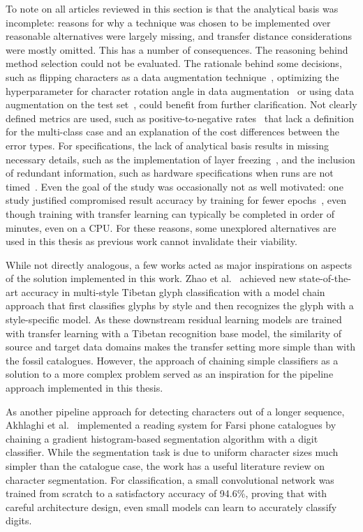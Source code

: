 \documentclass[english,twoside,openright]{UH_DS_MSc}
\begin{document}
To note on all articles reviewed in this section is that the analytical basis was incomplete: reasons for why a technique 
was chosen to be implemented over reasonable alternatives were largely missing, and transfer distance considerations were 
mostly omitted. This has a number of consequences. The reasoning behind method selection could not be evaluated. The rationale 
behind some decisions, such as flipping characters as a data augmentation technique~\cite{9thuonPalm}, optimizing the hyperparameter for character
 rotation angle in data augmentation~\cite{7rizkybasicCnnTransfer} or using data augmentation on the test set~\cite{11zunairUnconventionalWisdom}, could benefit from 
 further clarification. Not clearly defined metrics are used, such as positive-to-negative rates~\cite{10goelGujarati, 5rasheedHandwrittenUrduWAlexNet} that lack a definition for 
 the multi-class case and an explanation of the cost differences between the error types. For specifications, the lack of analytical
  basis results in missing necessary details, such as the implementation of layer freezing~\cite{8goelGujarati2023}, and the inclusion of redundant information,
   such as hardware specifications when runs are not timed~\cite{9thuonPalm}. Even the goal of the study was occasionally not as well motivated: one 
   study justified compromised result accuracy by training for fewer epochs~\cite{3chatterjeeBengali}, even though training with transfer learning can typically 
   be completed in order of minutes, even on a CPU. For these reasons, some unexplored alternatives are used in this
    thesis as previous work cannot invalidate their viability.

While not directly analogous, a few works acted as major inspirations on aspects of the solution implemented in this work.
Zhao et al.~\cite{4zhaoTibetan} achieved new state-of-the-art accuracy in multi-style Tibetan glyph classification
with a model chain approach that first classifies glyphs by style and then recognizes the glyph with a style-specific model. As these downstream
 residual learning models are trained with transfer learning with a Tibetan 
 recognition base model, the similarity of source and target data domains makes the transfer setting more simple than with
the fossil catalogues. However, the approach of 
  chaining simple classifiers as a solution to a more complex problem served as an inspiration for
   the pipeline approach implemented in this thesis.

As another pipeline approach for detecting characters out of a longer sequence, Akhlaghi et al.~\cite{1akhlaghiFarsi} implemented 
a reading system for Farsi phone catalogues by chaining a gradient histogram-based segmentation 
algorithm with a digit classifier. While the segmentation task is due to uniform character
 sizes much simpler than the catalogue case, the work has a useful literature review on
  character segmentation. For classification, a small convolutional network was trained
   from scratch to a satisfactory accuracy of 94.6\%, proving that with careful architecture design,
    even small models can learn to accurately classify digits.
\end{document}
